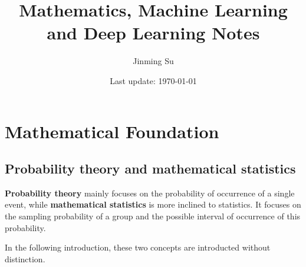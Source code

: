 \documentclass[10pt,onecolumn]{book}
\begin{document}
\date{}

\title{\textbf{Mathematics, Machine Learning and Deep Learning Notes}}

\author{Jinming Su}
\date{Last update: \today}

\maketitle

\thispagestyle{empty}
\newpage
{}
\newpage
\tableofcontents
\newpage
\listoftodos

\newpage
{}
\mainmatter

\chapter{Mathematical Foundation}
\section{Probability theory and mathematical statistics}
\textbf{Probability theory} mainly focuses on the probability of occurrence of a single event, while \textbf{mathematical statistics} is more inclined to statistics. It focuses on the sampling probability of a group and the possible interval of occurrence of this probability.

In the following introduction, these two concepts are introducted without distinction. 
\end{document}
